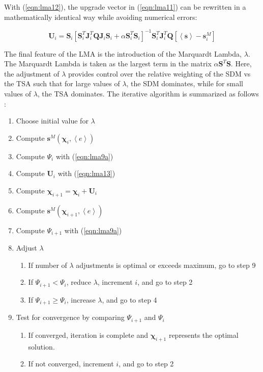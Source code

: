 With (\ref{eqn:lma12}), the upgrade vector in (\ref{eqn:lma11}) can be rewritten in a mathematically identical way while avoiding numerical errors:

\begin{equation}
\mathbf{U}_i= \mathbf{S}_i\left[\mathbf{S}_i^T\mathbf{J}_i^T\mathbf{Q}\mathbf{J}_i\mathbf{S}_i+\alpha\mathbf{S}_i^T\mathbf{S}_i\right]^{-1}\mathbf{S}_i^T\mathbf{J}_i^T\mathbf{Q}\left[\left<\mathbf{s}\right>-\mathbf{s}^M_i\right]
\label{eqn:lma13}
\end{equation}

The final feature of the LMA is the introduction of the Marquardt Lambda, $\lambda$. The Marquardt Lambda is taken as the largest term in the matrix $\alpha\mathbf{S}^T\mathbf{S}$. Here, the adjustment of $\lambda$ provides control over the relative weighting of the SDM vs the TSA such that for large values of $\lambda$, the SDM dominates, while for small values of $\lambda$, the TSA dominates. The iterative algorithm is summarized as follows \citep{matott_ostrich:_2008}:

\begin{enumerate}
\item Choose initial value for $\lambda$
\item Compute $\mathbf{s}^M \left(\boldsymbol{\chi}_i, \left< e \right>\right)$
\item Compute $\Psi_i$ with (\ref{eqn:lma9a})
\item Compute $\mathbf{U}_i$ with (\ref{eqn:lma13})
\item Compute $\boldsymbol{\chi}_{i+1}=\boldsymbol{\chi}_i+\mathbf{U}_i$
\item Compute $\mathbf{s}^M \left(\boldsymbol{\chi}_{i+1}, \left< e \right>\right)$
\item Compute $\Psi_{i+1}$ with (\ref{eqn:lma9a})
\item Adjust $\lambda$
\begin{enumerate}
\item If number of $\lambda$ adjustments is optimal or exceeds maximum, go to step 9
\item If $\Psi_{i+1} < \Psi_i$, reduce $\lambda$, increment $i$, and go to step 2
\item If $\Psi_{i+1} \geq \Psi_i$, increase $\lambda$, and go to step 4
\end{enumerate}
\item Test for convergence by comparing $\Psi_{i+1}$ and $\Psi_i$
\begin{enumerate}
\item If converged, iteration is complete and $\boldsymbol{\chi}_{i+1}$ represents the optimal solution.
\item If not converged, increment $i$, and go to step 2
\end{enumerate}
\end{enumerate}

